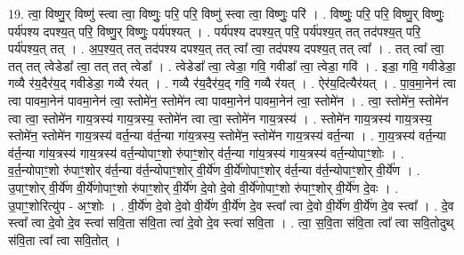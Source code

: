 \documentclass[17pt]{extarticle}
\begin{document}
19. त्वा॒ विष्णु॒र् विष्णु॑ स्त्वा त्वा॒ विष्णुः॒ परि॒ परि॒ विष्णु॑ स्त्वा त्वा॒ विष्णुः॒ परि॑ । . विष्णुः॒ परि॒ परि॒ विष्णु॒र् विष्णुः॒ पर्य॑पश्य दपश्य॒त् परि॒ विष्णु॒र् विष्णुः॒ पर्य॑पश्यत् । . पर्य॑पश्य दपश्य॒त् परि॒ पर्य॑पश्य॒त् तत् तद॑पश्य॒त् परि॒ पर्य॑पश्य॒त् तत् । . अ॒प॒श्य॒त् तत् तद॑पश्य दपश्य॒त् तत् त्वा᳚ त्वा॒ तद॑पश्य दपश्य॒त् तत् त्वा᳚ । . तत् त्वा᳚ त्वा॒ तत् तत् त्वेडेडा᳚ त्वा॒ तत् तत् त्वेडा᳚ । . त्वेडेडा᳚ त्वा॒ त्वेडा॒ गवि॒ गवीडा᳚ त्वा॒ त्वेडा॒ गवि॑ । . इडा॒ गवि॒ गवीडेडा॒ गव्यै र॑य॒दैर॑य॒द् गवीडेडा॒ गव्यै र॑यत् । . गव्यै र॑य॒दैर॑य॒द् गवि॒ गव्यै र॑यत् । . ऐर॑य॒दित्यैर॑यत् । . पा॒व॒मा॒नेन॑ त्वा त्वा पावमा॒नेन॑ पावमा॒नेन॑ त्वा॒ स्तोमे॑न॒ स्तोमे॑न त्वा पावमा॒नेन॑ पावमा॒नेन॑ त्वा॒ स्तोमे॑न । . त्वा॒ स्तोमे॑न॒ स्तोमे॑न त्वा त्वा॒ स्तोमे॑न गाय॒त्रस्य॑ गाय॒त्रस्य॒ स्तोमे॑न त्वा त्वा॒ स्तोमे॑न गाय॒त्रस्य॑ । . स्तोमे॑न गाय॒त्रस्य॑ गाय॒त्रस्य॒ स्तोमे॑न॒ स्तोमे॑न गाय॒त्रस्य॑ वर्त॒न्या व॑र्त॒न्या गा॑य॒त्रस्य॒ स्तोमे॑न॒ स्तोमे॑न गाय॒त्रस्य॑ वर्त॒न्या । . गा॒य॒त्रस्य॑ वर्त॒न्या व॑र्त॒न्या गा॑य॒त्रस्य॑ गाय॒त्रस्य॑ वर्त॒न्योपाꣳ॒॒शो रु॑पाꣳ॒॒शोर् व॑र्त॒न्या गा॑य॒त्रस्य॑ गाय॒त्रस्य॑ वर्त॒न्योपाꣳ॒॒शोः । . व॒र्त॒न्योपाꣳ॒॒शो रु॑पाꣳ॒॒शोर् व॑र्त॒न्या व॑र्त॒न्योपाꣳ॒॒शोर् वी॒र्ये॑ण वी॒र्ये॑णोपाꣳ॒॒शोर् व॑र्त॒न्या व॑र्त॒न्योपाꣳ॒॒शोर् वी॒र्ये॑ण । . उ॒पाꣳ॒॒शोर् वी॒र्ये॑ण वी॒र्ये॑णोपाꣳ॒॒शो रु॑पाꣳ॒॒शोर् वी॒र्ये॑ण दे॒वो दे॒वो वी॒र्ये॑णोपाꣳ॒॒शो रु॑पाꣳ॒॒शोर् वी॒र्ये॑ण दे॒वः । . उ॒पाꣳ॒॒शोरित्यु॑प - अꣳ॒॒शोः । . वी॒र्ये॑ण दे॒वो दे॒वो वी॒र्ये॑ण वी॒र्ये॑ण दे॒व स्त्वा᳚ त्वा दे॒वो वी॒र्ये॑ण वी॒र्ये॑ण दे॒व स्त्वा᳚ । . दे॒व स्त्वा᳚ त्वा दे॒वो दे॒व स्त्वा॑ सवि॒ता स॑वि॒ता त्वा॑ दे॒वो दे॒व स्त्वा॑ सवि॒ता । . त्वा॒ स॒वि॒ता स॑वि॒ता त्वा᳚ त्वा सवि॒तोदुथ् स॑वि॒ता त्वा᳚ त्वा सवि॒तोत् । \newline
\end{document}
